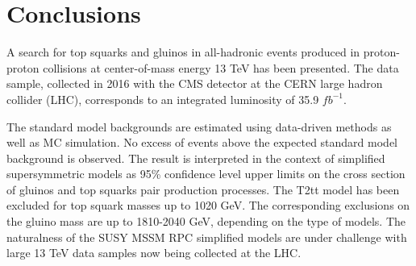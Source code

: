 \chapter{Conclusions}

A search for top squarks and gluinos in all-hadronic events produced in proton-proton collisions at center-of-mass energy 13 TeV has been presented. The data sample, collected in 2016 with the CMS detector at the CERN large hadron collider (LHC), corresponds to an integrated luminosity of 35.9 $fb^{-1}$.

The standard model backgrounds are estimated using data-driven methods as well as MC simulation. No excess of events above the expected standard model background is observed. The result is interpreted in the context of simplified supersymmetric models as 95\% confidence level upper limits on the cross section of gluinos and top squarks pair production processes. The T2tt model has been excluded for top squark masses up to 1020 GeV. The corresponding exclusions on the gluino mass are up to 1810-2040 GeV, depending on the type of models. The naturalness of the SUSY MSSM RPC simplified models are under challenge with large 13 TeV data samples now being collected at the LHC.

